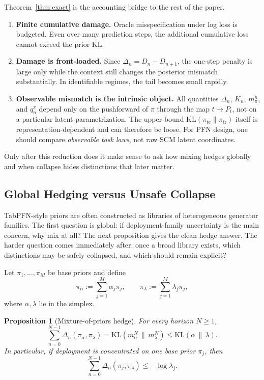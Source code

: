 \documentclass{article}
\newtheorem{proposition}[theorem]{Proposition}
\theoremstyle{definition}
\theoremstyle{remark}
\newcommand{\KL}{\mathrm{KL}}
\newcommand{\tr}{\mathrm{tr}}
\newcommand{\te}{\mathrm{te}}
\begin{document}
Theorem~\ref{thm:exact} is the accounting bridge to the rest of the paper.
\begin{enumerate}[leftmargin=18pt]
\item \textbf{Finite cumulative damage.} Oracle misspecification under log loss is budgeted. Even over many prediction steps, the additional cumulative loss cannot exceed the prior KL.
\item \textbf{Damage is front-loaded.} Since $\Delta_n=D_n-D_{n+1}$, the one-step penalty is large only while the context still changes the posterior mismatch substantially. In identifiable regimes, the tail becomes small rapidly.
\item \textbf{Observable mismatch is the intrinsic object.} All quantities $\Delta_n$, $K_n$, $m_\pi^n$, and $q_n^\pi$ depend only on the pushforward of $\pi$ through the map $t\mapsto P_t$, not on a particular latent parametrization. The upper bound $\KL(\pi_{\te}\|\pi_{\tr})$ itself is representation-dependent and can therefore be loose. For PFN design, one should compare \emph{observable task laws}, not raw SCM latent coordinates.
\end{enumerate}

Only after this reduction does it make sense to ask how mixing hedges globally and when collapse hides distinctions that later matter.

\subsection{Global Hedging versus Unsafe Collapse}

TabPFN-style priors are often constructed as libraries of heterogeneous generator families. The first question is global: if deployment-family uncertainty is the main concern, why mix at all? The next proposition gives the clean hedge answer. The harder question comes immediately after: once a broad library exists, which distinctions may be safely collapsed, and which should remain explicit?

Let $\pi_1,\dots,\pi_M$ be base priors and define
\[
\pi_\alpha := \sum_{j=1}^M \alpha_j \pi_j,
\qquad
\pi_\lambda := \sum_{j=1}^M \lambda_j \pi_j,
\]
where $\alpha,\lambda$ lie in the simplex.

\begin{proposition}[Mixture-of-priors hedge]
\label{thm:mixture}
For every horizon $N\ge 1$,
\[
\sum_{n=0}^{N-1}\Delta_n(\pi_\alpha,\pi_\lambda)
=
\KL(m_\alpha^N\,\|\,m_\lambda^N)
\le
\KL(\alpha\,\|\,\lambda).
\]
In particular, if deployment is concentrated on one base prior $\pi_j$, then
\[
\sum_{n=0}^{N-1}\Delta_n(\pi_j,\pi_\lambda)
\le
-\log \lambda_j.
\]
\end{proposition}
\end{document}
